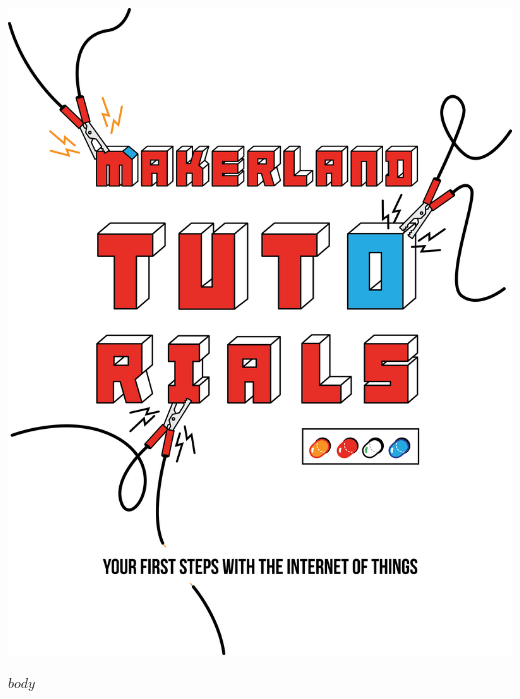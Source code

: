 \documentclass{book}
\begin{document}
\thispagestyle{empty}

  \vspace*{\fill}
    \begin{center}
      \includegraphics[width=1\textwidth]{content/title.png}
    \end{center}
  \vspace*{\fill}

\newpage
\thispagestyle{empty}

\setcounter{page}{0}

\begingroup
\hypersetup{linkcolor=black}
\tableofcontents
\endgroup
  
  $body$
\end{document}
